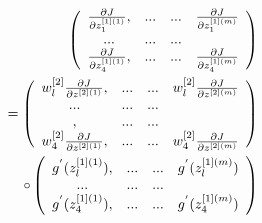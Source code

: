 \documentclass[a4paper]{article}
\begin{document}
\begin{align*}
 \left( \begin{array} {c c c c}
 \frac{\partial J}{\partial z_1^{[1](1)}}, &... &... &   \frac{\partial J}{\partial z_1^{[1](m)}}\\
 ... & ... & ... & \\
 \frac{\partial J}{\partial z_4^{[1](1)}}, &... &... &   \frac{\partial J}{\partial z_4^{[1](m)}} \\
\end{array} \right)\\
=
\left( \begin{array} {c c c c}
w_l^{[2]} \frac{\partial J}{ \partial z ^{[2](1)}} , &... &... & w_l^{[2]} \frac{\partial J}{ \partial z ^{[2](m)}}  \\
 ... & ... & ... & \\
 , &... &... &    \\
 w_4^{[2]} \frac{\partial J}{ \partial z ^{[2](1)}} , &... &... & w_4^{[2]} \frac{\partial J}{ \partial z ^{[2](m)}} 
\end{array} \right)\\
\circ
\left( \begin{array} {c c c c}
 g^{'}(z_l^{[1](1)}), &... &... &  g^{'}(z_l^{[1](m)})\\
 ... & ... & ... & \\
 g^{'}(z_4^{[1](1)}), &... &... &  g^{'}(z_4^{[1](m)}) \\
\end{array} \right)\\
\end{align*}
\end{document}
